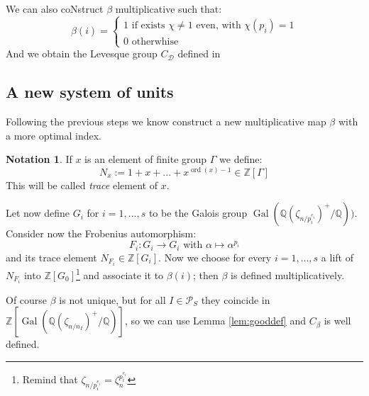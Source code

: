 \documentclass[]{article}
\theoremstyle{plain}
\theoremstyle{remark}
\theoremstyle{definition}
\newtheorem*{nota}{Notation}
\newcommand{\PS}{\mathcal{P}_S}
\newcommand{\Z}{\mathbb{Z}}
\newcommand{\Q}{\mathbb{Q}}
\DeclareMathOperator{\Gal}{Gal}
\DeclareMathOperator{\ord}{ord}
\begin{document}
	We can also coNstruct $\beta$ multiplicative such that:
	\[ \beta(i) = \begin{cases} 1 \text{ if exists } \chi \neq 1 \text{ even, with } \chi(p_i)=1 \\ 0 \text{ otherwhise } \end{cases}\]
	And we obtain the Levesque group $ C_\mathcal{D} $ defined in \cite[Page~331]{LEV}
	
	\subsection{A new system of units}
	
	Following the previous steps we know construct a new multiplicative map $\beta$ with a more optimal index. 
	\begin{nota}
		If $ x $ is an element of finite group $\Gamma$ we define:
		\[ N_x := 1 + x + ... + x^{\ord (x) - 1} \in \Z[\Gamma]\]
		This will be called \textit{trace} element of $ x $.
	\end{nota}

	Let now define $ G_i $ for $ i=1,...,s $ to be the Galois group $ \Gal ( \Q(\zeta_{n/p_i^{e_i}})^+ / \Q)) $. Consider now the Frobenius automorphism:  
	\[ F_i : G_i \to G_i \text{ with }  \alpha \mapsto \alpha ^ {p_i}\]
	and its trace element $ N_{F_i} \in \Z [G_i]$. Now we choose for every $ i=1, ... , s $ a lift of $ N_{F_i} $ into $ \Z[G_0] $\footnote{Remind that $ \zeta_{n/p_i^{e_i}} = \zeta_n^{p_i^{e_i}}$} and associate it to $\beta(i)$; then $\beta$ is defined multiplicatively. 
	
	Of course $\beta$ is not unique, but for all $ I \in \PS $ they coincide in $ \Z[\Gal( \Q(\zeta_{n/n_I})^+ / \Q   )]  $, so we can use Lemma \ref{lem:gooddef} and $ C_\beta $ is well defined. 
	
	
	\newpage
	\printbibliography
\end{document}
